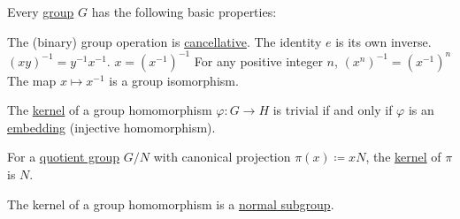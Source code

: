 \begin{proposition}\label{thm:def:group}
  Every \hyperref[def:group]{group} \( G \) has the following basic properties:
  \begin{thmenum}
     The (binary) group operation is \hyperref[def:magma/cancellative]{cancellative}.
     The identity \( e \) is its own inverse.
     \( (xy)^{-1} = y^{-1} x^{-1} \).
     \( x = (x^{-1})^{-1} \)
     For any positive integer \( n \), \( (x^n)^{-1} = (x^{-1})^n \)
     The map \( x \mapsto x^{-1} \) is a group isomorphism.

     The \hyperref[def:group/kernel]{kernel} of a group homomorphism \( \varphi: G \to H \) is trivial if and only if \( \varphi \) is an \hyperref[def:first_order_isomorphism]{embedding} (injective homomorphism).

     For a \hyperref[def:group/quotient]{quotient group} \( G / N \) with canonical projection \( \pi(x) \coloneqq xN \), the \hyperref[def:group/kernel]{kernel} of \( \pi \) is \( N \).

     The kernel of a group homomorphism is a \hyperref[thm:normal_subgroup_equivalences]{normal subgroup}.
  \end{thmenum}
\end{proposition}
